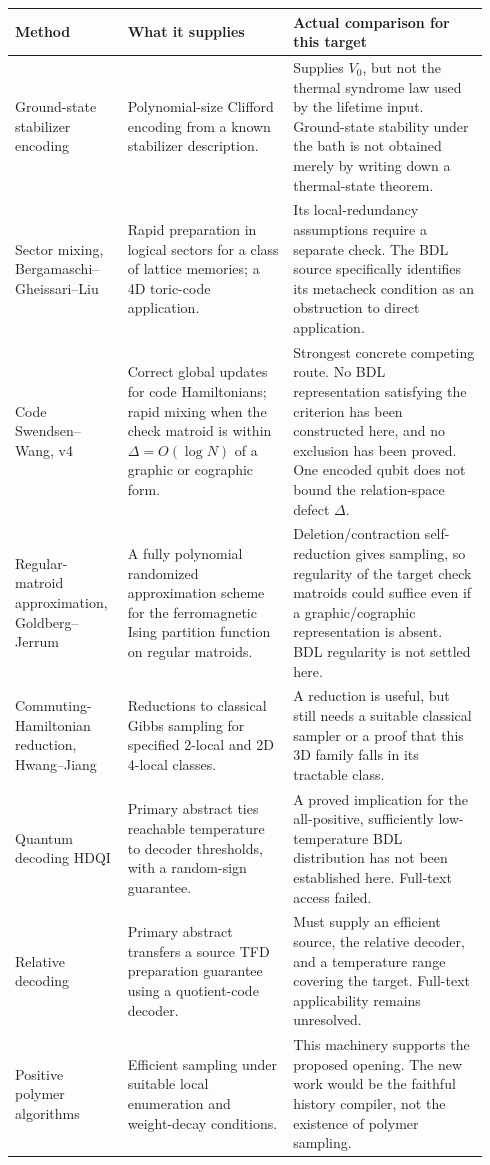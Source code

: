 \documentclass[11pt,a4paper]{article}
\begin{document}
\begin{longtable}{@{}P{0.22\linewidth}P{0.33\linewidth}P{0.39\linewidth}@{}}
\toprule
Method & What it supplies & Actual comparison for this target\\\midrule\endhead
Ground-state stabilizer encoding & Polynomial-size Clifford encoding from a known stabilizer description. & Supplies $V_0$, but not the thermal syndrome law used by the lifetime input. Ground-state stability under the bath is not obtained merely by writing down a thermal-state theorem.\\[5pt]
Sector mixing, Bergamaschi--Gheissari--Liu\cite{bgl} & Rapid preparation in logical sectors for a class of lattice memories; a 4D toric-code application. & Its local-redundancy assumptions require a separate check. The BDL source specifically identifies its metacheck condition as an obstruction to direct application.\\[5pt]
Code Swendsen--Wang, v4\cite{csw} & Correct global updates for code Hamiltonians; rapid mixing when the check matroid is within $\Delta=O(\log N)$ of a graphic or cographic form. & Strongest concrete competing route. No BDL representation satisfying the criterion has been constructed here, and no exclusion has been proved. One encoded qubit does not bound the relation-space defect $\Delta$.\\[5pt]
Regular-matroid approximation, Goldberg--Jerrum\cite{gj} & A fully polynomial randomized approximation scheme for the ferromagnetic Ising partition function on regular matroids. & Deletion/contraction self-reduction gives sampling, so regularity of the target check matroids could suffice even if a graphic/cographic representation is absent. BDL regularity is not settled here.\\[5pt]
Commuting-Hamiltonian reduction, Hwang--Jiang\cite{hj} & Reductions to classical Gibbs sampling for specified 2-local and 2D 4-local classes. & A reduction is useful, but still needs a suitable classical sampler or a proof that this 3D family falls in its tractable class.\\[5pt]
Quantum decoding HDQI\cite{qd} & Primary abstract ties reachable temperature to decoder thresholds, with a random-sign guarantee. & A proved implication for the all-positive, sufficiently low-temperature BDL distribution has not been established here. Full-text access failed.\\[5pt]
Relative decoding\cite{relative} & Primary abstract transfers a source TFD preparation guarantee using a quotient-code decoder. & Must supply an efficient source, the relative decoder, and a temperature range covering the target. Full-text applicability remains unresolved.\\[5pt]
Positive polymer algorithms\cite{cgpsv,hpr} & Efficient sampling under suitable local enumeration and weight-decay conditions. & This machinery supports the proposed opening. The new work would be the faithful history compiler, not the existence of polymer sampling.\\
\bottomrule
\end{longtable}
\end{document}
